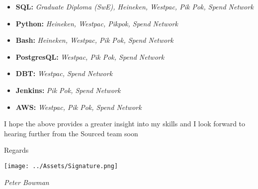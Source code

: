 \documentclass[10pt,A4]{article}
\newcommand{\businessname}{Sourced}
\begin{document}
\begin{itemize}[leftmargin=16pt]
	\setlength\itemsep{0.0005em}
	\item \textbf{SQL:} \textit{Graduate Diploma (SwE), Heineken, Westpac, Pik Pok, Spend Network}
	\item \textbf{Python:} \textit{Heineken, Westpac, Pikpok, Spend Network}
	\item \textbf{Bash:} \textit{Heineken, Westpac, Pik Pok, Spend Network}
	\item \textbf{PostgresQL:} \textit{Westpac, Pik Pok, Spend Network}
	\item \textbf{DBT:} \textit{Westpac, Spend Network}
	\item \textbf{Jenkins:} \textit{Pik Pok, Spend Network}
	\item \textbf{AWS:} \textit{Westpac, Pik Pok, Spend Network}
\end{itemize}

%
\par \vspace{12pt}
I hope the above provides a greater insight into my skills and I look forward to hearing further from the \businessname{} team soon
\par \vspace{8pt}
Regards
\par \vspace{8pt}
\texttt{[image: ../Assets/Signature.png]}
\par \vspace{2pt}
\textit{ \textcolor{softcol} {Peter Bowman}}
%

\end{document}
